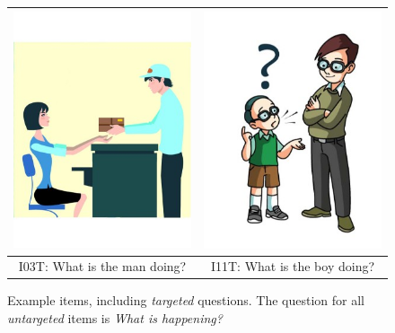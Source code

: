 \documentclass[12pt]{article}
\begin{document}
\begin{figure}[h]
\begin{center}
\begin{tabular}{|c|c|}
\includegraphics[width=0.35\columnwidth,trim=0 0 0 -3]{figures/I03.jpg} & \includegraphics[width=0.35\columnwidth,trim=0 0 0 -3]{figures/I11.jpg}\\
\hline
I03T: What is the man doing? & I11T: What is the boy doing? \\
\hline
\end{tabular}
\end{center}
\caption{Example items, including \textit{targeted} questions. The question for all \textit{untargeted} items is \textit{What is happening?}}
\label{fig:appendix1}
\end{figure}

\clearpage 



\end{document}
